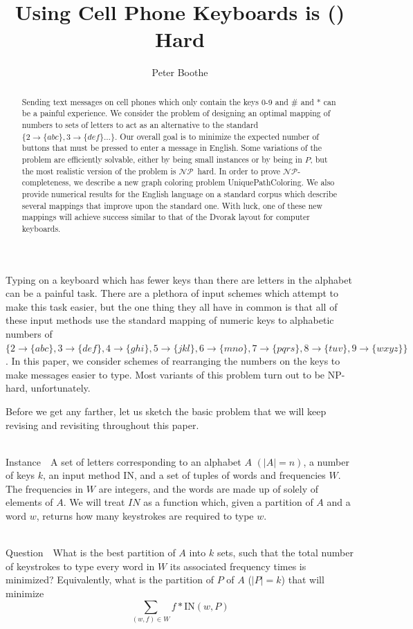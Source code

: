 \documentclass[runningheads]{llncs}
\title{Using Cell Phone Keyboards is (\NP) Hard}
\author{Peter Boothe}
\institute{Manhattan College\\
\email{peter.boothe@manhattan.edu}
}
\newcommand{\NP}{\ensuremath{\mathcal{NP}}}
\newcommand{\Instance}{{\sc Instance~}}
\newcommand{\Question}{~\\
{\sc Question~}}
\begin{document}
\maketitle

\begin{abstract}
Sending text messages on cell phones which only contain the keys 0-9 and \# and
* can be a painful experience.  We consider the problem of designing an optimal
mapping of numbers to sets of letters to act as an alternative to the standard
$\{2\to\{abc\}, 3\to\{def\}\ldots\}$.  Our overall goal is to minimize the
expected number of buttons that must be pressed to enter a message in English.
Some variations of the problem are efficiently solvable, either by being small
instances or by being in \ensuremath{P}, but the most realistic version of the
problem is \NP\ hard.  In order to prove \NP-completeness, we describe a new
graph coloring problem {\sc UniquePathColoring}.  We also provide numerical
results for the English language on a standard corpus which describe several
mappings that improve upon the standard one.  With luck, one of these new
mappings will achieve success similar to that of the Dvorak layout for computer
keyboards.
\end{abstract}

Typing on a keyboard which has fewer keys than there are letters in the
alphabet can be a painful task.  There are a plethora of input schemes which
attempt to make this task easier, but the one thing they all have in common is
that all of these input methods use the standard mapping of numeric keys to
alphabetic numbers of 
$\{2\to\{abc\},
         3\to\{def\}, 4\to\{ghi\}, 5\to\{jkl\}, 6\to\{mno\}, 7\to\{pqrs\},
         8\to\{tuv\}, 9\to\{wxyz\}\}$.
In this paper, we consider schemes of rearranging the numbers on the keys to
make messages easier to type.  Most variants of this problem turn out to be
NP-hard, unfortunately.

Before we get any farther, let us sketch the basic problem that we will keep
revising and revisiting throughout this paper.  \begin{prob}[{\sc
MinimumKeystrokes}]~\\ \Instance\ A set of letters corresponding to an alphabet
$A$ $(|A| = n)$, a number of keys $k$, an input method $\mathrm{IN}$, and a set
of tuples of words and frequencies $W$.  The frequencies in $W$ are integers,
and the words are made up of solely of elements of $A$.  We will treat $IN$ as
a function which, given a partition of $A$ and a word $w$, returns how many
keystrokes are required to type $w$.

\Question\ What is the best partition of $A$ into $k$ sets, such that the
total number of keystrokes to type every word in $W$ its associated frequency
times is minimized?  Equivalently, what is the partition of $P$ of $A$ ($|P| = k$) that
will minimize
$$\sum_{(w,f)\in W} f*\mathrm{IN}(w,P)$$
\label{probtemplate}
\end{prob}
\end{document}
